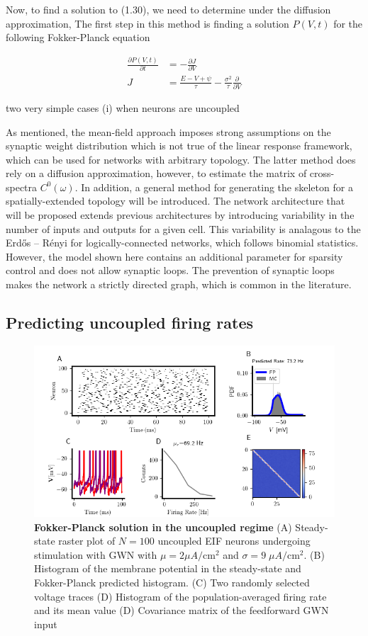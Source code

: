\documentclass{ucetd}
\begin{document}
Now, to find a solution to (1.30), we need to determine under the diffusion approximation, The first step in this method is finding a solution $P(V,t)$ for the following Fokker-Planck equation

\begin{align*}
\frac{\partial P(V,t)}{\partial t} &= -\frac{\partial J}{\partial V}\\
J &= \frac{E-V+\psi}{\tau} - \frac{\sigma^{2}}{\tau}\frac{\partial}{\partial V}
\end{align*}

two very simple cases (i) when neurons are uncoupled 

As mentioned, the mean-field approach imposes strong assumptions on the synaptic weight distribution which is not true of the linear response framework, which can be used for networks with arbitrary topology. The latter method does rely on a diffusion approximation, however, to estimate the matrix of cross-spectra $C^{0}(\omega)$.
 In addition, a general method for generating the skeleton for a spatially-extended topology will be introduced. The network architecture that will be proposed extends previous architectures by introducing variability in the number of inputs and outputs for a given cell. This variability is analagous to the Erdős – Rényi for logically-connected networks, which follows binomial statistics. However, the model shown here contains an additional parameter for sparsity control and does not allow synaptic loops. The prevention of synaptic loops makes the network a strictly directed graph, which is common in the literature.

\subsection{Predicting uncoupled firing rates}

\begin{figure}[t!]
\centering
\includegraphics[width=175mm]{figure-3}
\caption{\textbf{Fokker-Planck solution in the uncoupled regime} (A) Steady-state raster plot of $N=100$ uncoupled EIF neurons undergoing stimulation with GWN with $\mu = 2\mu A/\mathrm{cm}^{2}$ and $\sigma = 9 \;\mu A/\mathrm{cm}^{2}$. (B) Histogram of the membrane potential in the steady-state and Fokker-Planck predicted histogram. (C) Two randomly selected voltage traces (D) Histogram of the population-averaged firing rate and its mean value (D) Covariance matrix of the feedforward GWN input}
\end{figure}
\end{document}
